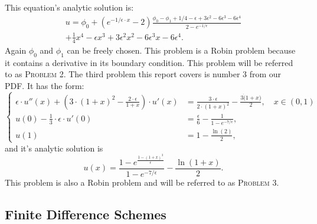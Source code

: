 \documentclass[../00_main.tex]{subfiles}
\begin{document}
This equation's analytic solution is:
\begin{equation}\nonumber
    \begin{gathered}
        u = \phi_0  + (e^{-1/\epsilon \cdot x} - 2)
            \frac{\phi_0-\phi_1+1/4 -\epsilon+3\epsilon^2-6\epsilon^3-
            6\epsilon^4}{2 - e^{-1/\epsilon}}    \\
        + \frac{1}{4}x^4 - \epsilon x^3 + 3\epsilon^2 x^2
            - 6 \epsilon^3 x - 6 \epsilon^4.
    \end{gathered}
\end{equation}
Again $\phi_0$ and $\phi_1$ can be freely chosen. This problem is a Robin 
problem because it contains a derivative in its boundary condition. This problem 
will be referred to as \textsc{Problem 2}. The third problem this report covers 
is number 3 from our PDF. It has the form:
\begin{equation}\label{eq:bvp3}
    \begin{cases}
        \epsilon \cdot u''(x) + \left(3\cdot(1+x)^2-\frac{2\cdot\epsilon}{1+x}
            \right) \cdot u'(x) &= \frac{3\cdot\epsilon}{2\cdot(1+x)^2} 
            - \frac{3\dot(1+x)}{2},
            \quad x \in (0,1) \\
        u(0) - \frac{1}{3}\cdot\epsilon\cdot u'(0) &= \frac{\epsilon}{6}
        - \frac{1}{1-e^{-7/\epsilon}},   \\
        u(1) &= 1 - \frac{\ln(2)}{2},
    \end{cases}
\end{equation}
and it's analytic solution is 
\begin{equation}\nonumber
    u(x) = \frac{1 - e^{\frac{1-(1+x)^3}{\epsilon}}}{1-e^{-7/\epsilon}} 
        - \frac{\ln(1+x)}{2}.
\end{equation}
This problem is also a Robin problem and will be referred to as 
\textsc{Problem 3}.

\subsection{Finite Difference Schemes}
\end{document}
